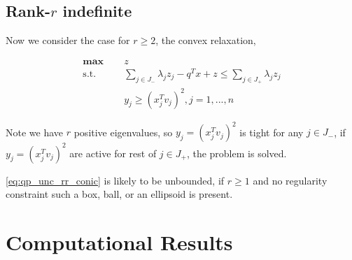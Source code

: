 \documentclass[a4paper, 10pt]{article}
\newcommand{\mx}{\mathbf{\max}\;}
\newcommand{\st}{\mathrm{s.t.\;}}
\begin{document}
\subsection{Rank-\(r\) indefinite}
Now we consider the case for \(r \ge 2\), the convex relaxation,

\begin{equation}\label{eq:qp_unc_rr_conic}
    \begin{aligned}
        \mx \quad & z                                                                                  \\
        \st \quad & \sum_{j \in J_{-}} \lambda_{j} z_j - q^T x+z \le  \sum_{j \in J_{+}} \lambda_j z_j \\
                  & y_j \ge (x_j^T v_j)^2, j= 1, ..., n
    \end{aligned}
\end{equation}

Note we have \(r\) positive eigenvalues, so \(y_j = (x_j^Tv_j)^2\) is tight for any \(j \in J_-\), if \(y_j = (x_j^Tv_j)^2\) are active for rest of \(j\in J_+\), the problem is solved.

\eqref{eq:qp_unc_rr_conic} is likely to be unbounded, if \(r \ge 1\) and no regularity constraint such a box, ball, or an ellipsoid is present.



\pagebreak

\section{Computational Results}
\end{document}

